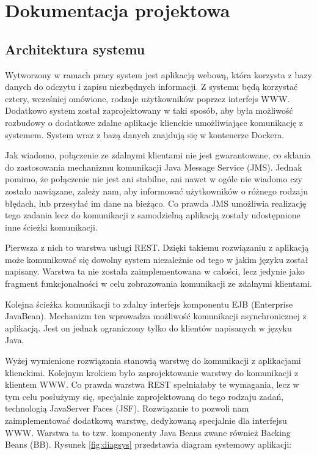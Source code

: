 \chapter{Dokumentacja projektowa}

\section{Architektura systemu}
Wytworzony w ramach pracy system jest aplikacją webową, która korzysta z bazy danych do odczytu i zapisu niezbędnych informacji. Z systemu będą korzystać cztery, wcześniej omówione, rodzaje użytkowników poprzez interfejs WWW. Dodatkowo system został zaprojektowany w taki sposób, aby była możliwość rozbudowy o dodatkowe zdalne aplikacje klienckie umożliwiające komunikację z systemem. System wraz z bazą danych znajdują się w kontenerze Dockera.

Jak wiadomo, połączenie ze zdalnymi klientami nie jest gwarantowane, co skłania do zastosowania mechanizmu komunikacji Java Message Service (JMS). Jednak pomimo, że połączenie nie jest ani stabilne, ani nawet w ogóle nie wiadomo czy zostało nawiązane, zależy nam, aby informować użytkowników o różnego rodzaju błędach, lub przesyłać im dane na bieżąco. Co prawda JMS umożliwia realizację tego zadania lecz do komunikacji z samodzielną aplikacją zostały udostępnione inne ścieżki komunikacji. 

Pierwsza z nich to warstwa usługi REST. Dzięki takiemu rozwiązaniu z aplikacją może komunikować się dowolny system niezależnie od tego w jakim języku został napisany. Warstwa ta nie została zaimplementowana w całości, lecz jedynie jako fragment funkcjonalności w celu zobrazowania komunikacji ze zdalnymi klientami.

Kolejna ścieżka komunikacji to zdalny interfejs komponentu EJB (Enterprise JavaBean). Mechanizm ten wprowadza możliwość komunikacji asynchronicznej z aplikacją. Jest on jednak ograniczony tylko do klientów napisanych w języku Java.

Wyżej wymienione rozwiązania stanowią warstwę do komunikacji z aplikacjami klienckimi. Kolejnym krokiem było zaprojektowanie warstwy do komunikacji z klientem WWW. Co prawda warstwa REST spełniałaby te wymagania, lecz w tym celu posłużymy się, specjalnie zaprojektowaną do tego rodzaju zadań, technologią JavaServer Faces (JSF). Rozwiązanie to pozwoli nam zaimplementować dodatkową warstwę, dedykowaną specjalnie dla interfejsu WWW. Warstwa ta to tzw. komponenty Java Beans zwane również Backing Beans (BB). Rysunek \ref{fig:diagsys} przedstawia diagram systemowy aplikacji:

